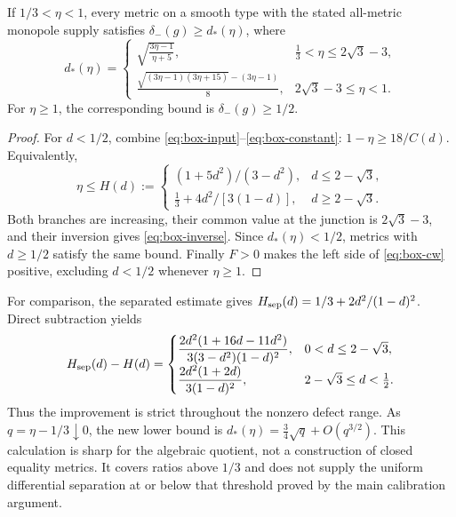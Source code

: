 \begin{corollary}\label{cor:box-topological}
If $1/3<\eta<1$, every metric on a smooth type with the stated
all-metric monopole supply satisfies $\delta_-(g)\ge d_*(\eta)$, where
\begin{equation}\label{eq:box-inverse}
 d_*(\eta)=
 \begin{cases}
 \displaystyle\sqrt{\frac{3\eta-1}{\eta+5}},
 &\frac13<\eta\le2\sqrt3-3,\\[2mm]
 \displaystyle\frac{\sqrt{(3\eta-1)(3\eta+15)}-(3\eta-1)}8,
 &2\sqrt3-3\le\eta<1.
 \end{cases}
\end{equation}
For $\eta\ge1$, the corresponding bound is $\delta_-(g)\ge1/2$.
\end{corollary}
\begin{proof}
For $d<1/2$, combine \eqref{eq:box-input}--\eqref{eq:box-constant}:
$1-\eta\ge18/C(d)$. Equivalently,
\[
 \eta\le H(d):=
 \begin{cases}
 (1+5d^2)/(3-d^2),&d\le2-\sqrt3,\\
 \frac13+4d^2/[3(1-d)],&d\ge2-\sqrt3.
 \end{cases}
\]
Both branches are increasing, their common value at the junction is
$2\sqrt3-3$, and their inversion gives \eqref{eq:box-inverse}.
Since $d_*(\eta)<1/2$, metrics with $d\ge1/2$ satisfy the same bound.
Finally $F>0$ makes the left side of \eqref{eq:box-cw} positive,
excluding $d<1/2$ whenever $\eta\ge1$.
\end{proof}

For comparison, the separated estimate gives
$H_{\rm sep}(d)=1/3+2d^2/(1-d)^2$. Direct subtraction yields
\[
 H_{\rm sep}(d)-H(d)=
 \begin{cases}
 \displaystyle\frac{2d^2(1+16d-11d^2)}{3(3-d^2)(1-d)^2},
       &0<d\le2-\sqrt3,\\[2mm]
 \displaystyle\frac{2d^2(1+2d)}{3(1-d)^2},
       &2-\sqrt3\le d<\tfrac12.
 \end{cases}
\]
Thus the improvement is strict throughout the nonzero defect range.
As $q=\eta-1/3\downarrow0$, the new lower bound is
$d_*(\eta)=\frac34\sqrt q+O(q^{3/2})$. This calculation is sharp for
the algebraic quotient, not a construction of closed equality metrics.
It covers ratios above $1/3$ and does not supply the uniform differential
separation at or below that threshold proved by the main calibration
argument.
